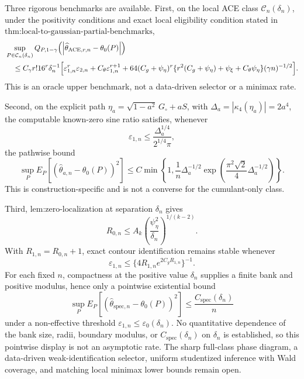 Three rigorous benchmarks are available.  First, on the local ACE class \(\mathcal C_n(\delta_n)\), under the positivity conditions and exact local eligibility condition stated in \(\text{thm:local-to-gaussian-partial-benchmarks}\),
\[
\begin{aligned}
 &\sup_{P\in\mathcal C_n(\delta_n)}
 Q_{P,1-\gamma}\!\left(\left|\widehat\theta_{\mathrm{ACE},r,n}-\theta_0(P)\right|\right)\\
 &\quad\le C_{\gamma}r!16^r\delta_n^{-1}
 \Bigl[\varepsilon_{1,n}^r\varepsilon_{2,n}
 +C_{\theta}\varepsilon_{1,n}^{r+1}
 +64(C_g+\psi_{\eta})^r
 \{r^2(C_g+\psi_{\eta})+\psi_{\xi}+C_{\theta}\psi_{\eta}\}
 (\gamma n)^{-1/2}\Bigr].
\end{aligned}
\]
This is an oracle upper benchmark, not a data-driven selector or a minimax rate.

Second, on the explicit path \(\eta_a=\sqrt{1-a^2}\,G_{\circ}+aS\), with \(\Delta_a=|\kappa_4(\eta_a)|=2a^4\), the computable known-zero sine ratio satisfies, whenever
\[
 \varepsilon_{1,n}\le\frac{\Delta_a^{1/4}}{2^{1/4}\pi},
\]
the pathwise bound
\[
 \sup_P E_P[(\widehat\theta_{a,n}-\theta_0(P))^2]
 \le C\min\!\left\{1,
 \frac1n\Delta_a^{-1/2}
 \exp\!\left(\frac{\pi^2\sqrt2}{4}\Delta_a^{-1/2}\right)
 \right\}.
\]
This is construction-specific and is not a converse for the cumulant-only class.

Third, \(\text{lem:zero-localization}\) at separation \(\delta_n\) gives
\[
 R_{0,n}\le A_k\left(\frac{\psi_{\eta}^2}{\delta_n}\right)^{1/(k-2)}.
\]
With \(R_{1,n}=R_{0,n}+1\), exact contour identification remains stable whenever
\[
 \varepsilon_{1,n}\le\{4R_{1,n}e^{2C_gR_{1,n}}\}^{-1}.
\]
For each fixed \(n\), compactness at the positive value \(\delta_n\) supplies a finite bank and positive modulus, hence only a pointwise existential bound
\[
 \sup_P E_P[(\widehat\theta_{\mathrm{spec},n}-\theta_0(P))^2]
 \le\frac{C_{\mathrm{spec}}(\delta_n)}{n}
\]
under a non-effective threshold \(\varepsilon_{1,n}\le\varepsilon_0(\delta_n)\).  No quantitative dependence of the bank size, radii, boundary modulus, or \(C_{\mathrm{spec}}(\delta_n)\) on \(\delta_n\) is established, so this pointwise display is not an asymptotic rate.  The sharp full-class phase diagram, a data-driven weak-identification selector, uniform studentized inference with Wald coverage, and matching local minimax lower bounds remain open.